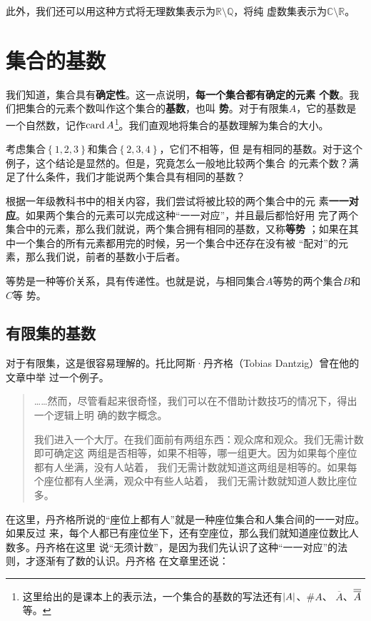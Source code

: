 此外，我们还可以用这种方式将无理数集表示为$\mathbb{R}\setminus\mathbb{Q}$，将纯
虚数集表示为$\mathbb{C}\setminus\mathbb{R}$。

\section{集合的基数}

我们知道，集合具有\textbf{确定性}。这一点说明，\textbf{每一个集合都有确定的元素
个数}。我们把集合的元素个数叫作这个集合的\textbf{基数}，也叫
\textbf{势}。对于有限集$A$，它的基数是一个自然数，记作$\operatorname{card}{A}
$\footnote{这里给出的是课本上的表示法，一个集合的基数的写法还有$\left|{A}\right|$、$\# A$、
$\overline{A}$、$\overline{\overline{{A}}}$等。}。我们直观地将集合的基数理解为集合的大小。

考虑集合$\left\{ 1,2,3 \right\} $和集合$\left\{ 2,3,4 \right\} $，它们不相等，但
是有相同的基数。对于这个例子，这个结论是显然的。但是，究竟怎么一般地比较两个集合
的元素个数？满足了什么条件，我们才能说两个集合具有相同的基数？

根据一年级教科书中的相关内容\cite{pep_math_1A}，我们尝试将被比较的两个集合中的元
素\textbf{一一对应}。如果两个集合的元素可以完成这种“一一对应”，并且最后都恰好用
完了两个集合中的元素，那么我们就说，两个集合拥有相同的基数，又称\textbf{等势}
；如果在其中一个集合的所有元素都用完的时候，另一个集合中还存在没有被
“配对”的元素，那么我们说，前者的基数小于后者。

等势是一种等价关系，具有传递性。也就是说，与相同集合$A$等势的两个集合$B$和$C$等
势。

\subsection{有限集的基数}

对于有限集，这是很容易理解的。托比阿斯·丹齐格（Tobias Dantzig）曾在他的文章中举
过一个例子。\cite{dantzig2007number}

\begin{quotation}
    ……然而，尽管看起来很奇怪，我们可以在不借助计数技巧的情况下，得出一个逻辑上明
    确的数字概念。

    我们进入一个大厅。在我们面前有两组东西：观众席和观众。我们无需计数即可确定这
    两组是否相等，如果不相等，哪一组更大。因为如果每个座位都有人坐满，没有人站着，
    我们无需计数就知道这两组是相等的。如果每个座位都有人坐满，观众中有些人站着，
    我们无需计数就知道人数比座位多。
\end{quotation}

在这里，丹齐格所说的“座位上都有人”就是一种座位集合和人集合间的一一对应。如果反过
来，每个人都已有座位坐下，还有空座位，那么我们就知道座位数比人数多。丹齐格在这里
说“无须计数”，是因为我们先认识了这种“一一对应”的法则，才逐渐有了数的认识。丹齐格
在文章里还说：

